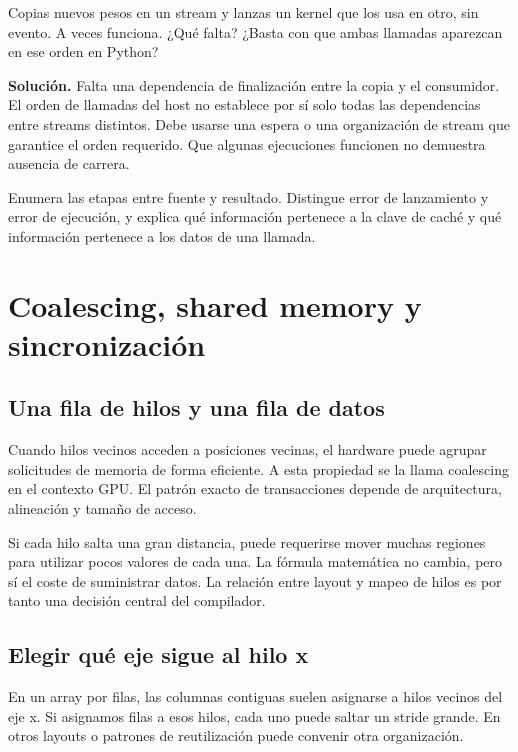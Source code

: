 \documentclass[12pt,a4paper,oneside]{report}
\begin{document}
\begin{practica}
Copias nuevos pesos en un stream y lanzas un kernel que los usa en otro, sin evento. A veces funciona. ¿Qué falta? ¿Basta con que ambas llamadas aparezcan en ese orden en Python?

\end{practica}
\textbf{Solución.} Falta una dependencia de finalización entre la copia y el consumidor. El orden de llamadas del host no establece por sí solo todas las dependencias entre streams distintos. Debe usarse una espera o una organización de stream que garantice el orden requerido. Que algunas ejecuciones funcionen no demuestra ausencia de carrera.

\begin{comprueba}
Enumera las etapas entre fuente y resultado. Distingue error de lanzamiento y error de ejecución, y explica qué información pertenece a la clave de caché y qué información pertenece a los datos de una llamada.

\end{comprueba}
\chapter{Coalescing, shared memory y sincronización}
\label{ch:gpu_memoria}
\section{Una fila de hilos y una fila de datos}
Cuando hilos vecinos acceden a posiciones vecinas, el hardware puede agrupar solicitudes de memoria de forma eficiente. A esta propiedad se la llama coalescing en el contexto GPU. El patrón exacto de transacciones depende de arquitectura, alineación y tamaño de acceso. \cite{cuda}

Si cada hilo salta una gran distancia, puede requerirse mover muchas regiones para utilizar pocos valores de cada una. La fórmula matemática no cambia, pero sí el coste de suministrar datos. La relación entre layout y mapeo de hilos es por tanto una decisión central del compilador.

\section{Elegir qué eje sigue al hilo x}
En un array por filas, las columnas contiguas suelen asignarse a hilos vecinos del eje x. Si asignamos filas a esos hilos, cada uno puede saltar un stride grande. En otros layouts o patrones de reutilización puede convenir otra organización.
\end{document}
